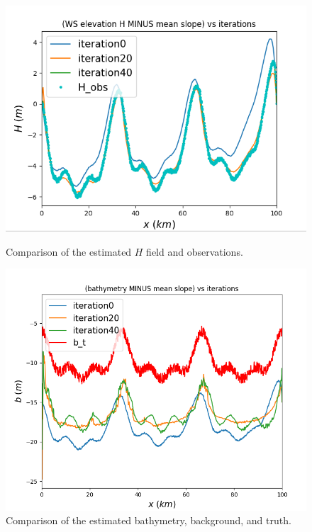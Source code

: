 \documentclass{article}
\begin{document}
\begin{figure}[H]
    \vspace{0.5cm}
    
    \begin{minipage}[b]{0.48\linewidth}
        \centering
        \includegraphics[width=\linewidth]{Images_Ayoub/With_Regularisation/Decreasing_Alpha/H_Comparaison.png}
        \caption{Comparison of the estimated \( H \) field and observations.}
        \label{fig:dec-h}
    \end{minipage}
    \hfill
    \begin{minipage}[b]{0.48\linewidth}
        \centering
        \includegraphics[width=\linewidth]{Images_Ayoub/With_Regularisation/Decreasing_Alpha/b_Comparaison.png}
        \caption{Comparison of the estimated bathymetry, background, and truth.}
        \label{fig:dec-b}
    \end{minipage}
    

\end{figure}
\end{document}
